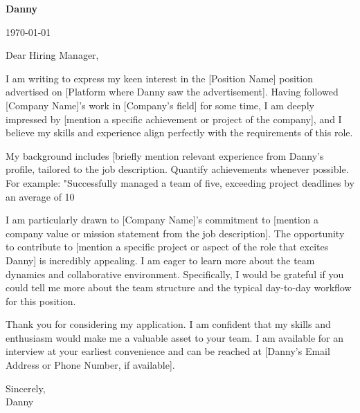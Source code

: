 \documentclass[letterpaper,11pt]{article}
\begin{document}
\textbf{Danny} \\
\vspace{20pt}

\today \\
\vspace{20pt}

Dear Hiring Manager, \\
\vspace{10pt}

I am writing to express my keen interest in the [Position Name] position advertised on [Platform where Danny saw the advertisement].  Having followed [Company Name]'s work in [Company's field] for some time, I am deeply impressed by [mention a specific achievement or project of the company], and I believe my skills and experience align perfectly with the requirements of this role.


My background includes [briefly mention relevant experience from Danny's profile,  tailored to the job description.  Quantify achievements whenever possible.  For example: "Successfully managed a team of five, exceeding project deadlines by an average of 10%


I am particularly drawn to [Company Name]'s commitment to [mention a company value or mission statement from the job description].  The opportunity to contribute to [mention a specific project or aspect of the role that excites Danny] is incredibly appealing. I am eager to learn more about the team dynamics and collaborative environment.  Specifically, I would be grateful if you could tell me more about the team structure and the typical day-to-day workflow for this position.


Thank you for considering my application. I am confident that my skills and enthusiasm would make me a valuable asset to your team. I am available for an interview at your earliest convenience and can be reached at [Danny's Email Address or Phone Number, if available].


Sincerely, \\
\vspace{40pt}
Danny
\end{document}
